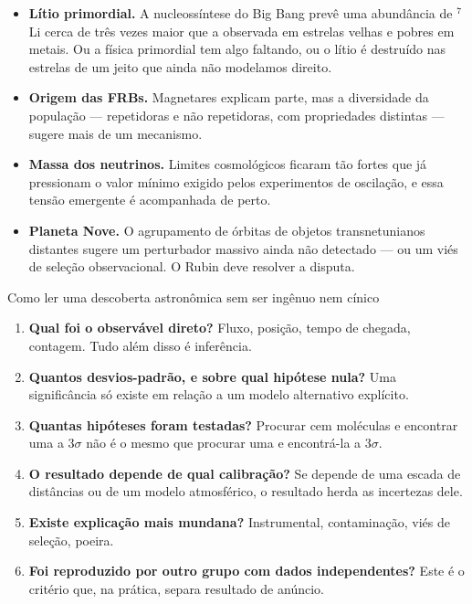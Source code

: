 \documentclass[11pt,a4paper]{article}
\begin{document}
\begin{itemize}
\item \textbf{Lítio primordial.} A nucleossíntese do Big Bang prevê uma abundância de $^{7}$Li cerca de três vezes maior que a observada em estrelas velhas e pobres em metais. Ou a física primordial tem algo faltando, ou o lítio é destruído nas estrelas de um jeito que ainda não modelamos direito.
\item \textbf{Origem das FRBs.} Magnetares explicam parte, mas a diversidade da população --- repetidoras e não repetidoras, com propriedades distintas --- sugere mais de um mecanismo.
\item \textbf{Massa dos neutrinos.} Limites cosmológicos ficaram tão fortes que já pressionam o valor mínimo exigido pelos experimentos de oscilação, e essa tensão emergente é acompanhada de perto.
\item \textbf{Planeta Nove.} O agrupamento de órbitas de objetos transnetunianos distantes sugere um perturbador massivo ainda não detectado --- ou um viés de seleção observacional. O Rubin deve resolver a disputa.
\end{itemize}

\begin{lessonblock}{Como ler uma descoberta astronômica sem ser ingênuo nem cínico}
\begin{enumerate}
\item \textbf{Qual foi o observável direto?} Fluxo, posição, tempo de chegada, contagem. Tudo além disso é inferência.
\item \textbf{Quantos desvios-padrão, e sobre qual hipótese nula?} Uma significância só existe em relação a um modelo alternativo explícito.
\item \textbf{Quantas hipóteses foram testadas?} Procurar cem moléculas e encontrar uma a $3\sigma$ não é o mesmo que procurar uma e encontrá-la a $3\sigma$.
\item \textbf{O resultado depende de qual calibração?} Se depende de uma escada de distâncias ou de um modelo atmosférico, o resultado herda as incertezas dele.
\item \textbf{Existe explicação mais mundana?} Instrumental, contaminação, viés de seleção, poeira.
\item \textbf{Foi reproduzido por outro grupo com dados independentes?} Este é o critério que, na prática, separa resultado de anúncio.
\end{enumerate}
\end{lessonblock}
\end{document}
